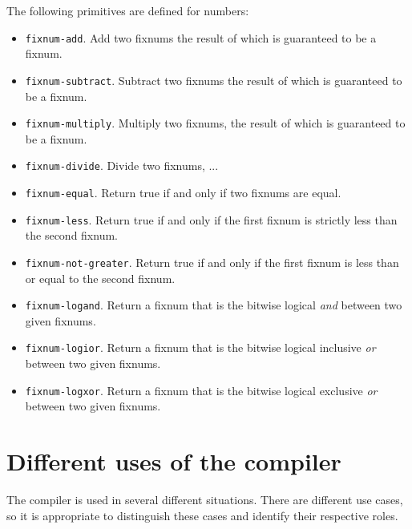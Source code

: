The following primitives are defined for numbers:

\begin{itemize}
\item \texttt{fixnum-add}.  Add two fixnums the result of which is
  guaranteed to be a fixnum.
\item \texttt{fixnum-subtract}.  Subtract two fixnums the result of
  which is guaranteed to be a fixnum.
\item \texttt{fixnum-multiply}.  Multiply two fixnums, the result of
  which is guaranteed to be a fixnum.
\item \texttt{fixnum-divide}.  Divide two fixnums, ...
\item \texttt{fixnum-equal}.  Return true if and only if two fixnums
  are equal.
\item \texttt{fixnum-less}.  Return true if and only if the first
  fixnum is strictly less than the second fixnum.
\item \texttt{fixnum-not-greater}.  Return true if and only if the first
  fixnum is less than or equal to the second fixnum.
\item \texttt{fixnum-logand}.  Return a fixnum that is the bitwise
  logical \emph{and} between two given fixnums.
\item \texttt{fixnum-logior}.  Return a fixnum that is the bitwise
  logical inclusive \emph{or} between two given fixnums.
\item \texttt{fixnum-logxor}.  Return a fixnum that is the bitwise
  logical exclusive \emph{or} between two given fixnums.
\end{itemize}


\section{Different uses of the compiler}
\label{sec-different-uses-of-the-compiler}

The compiler is used in several different situations.  There are
different use cases, so it is appropriate to distinguish these cases
and identify their respective roles.

